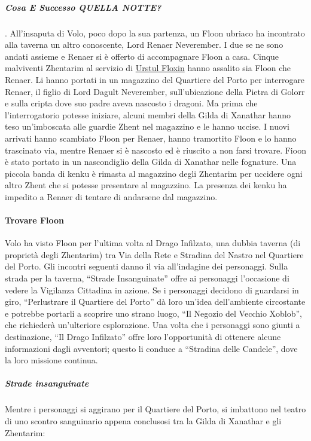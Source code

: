 \documentclass{article}
\begin{document}
                        \subparagraph{Cosa E Successo QUELLA NOTTE?} .
All’insaputa di Volo, poco dopo la sua partenza, un Floon
ubriaco ha incontrato alla taverna un altro conoscente,
Lord Renaer Neverember. I due se ne sono andati assieme
e Renaer si è offerto di accompagnare Floon a casa. Cinque
malviventi Zhentarim al servizio di \hyperlink{urstul}{Urstul Floxin}  hanno assalito sia Floon che Renaer. Li
hanno portati in un magazzino del Quartiere del Porto per
interrogare Renaer, il figlio di Lord Dagult Neverember,
sull’ubicazione della Pietra di Golorr e sulla cripta dove suo
padre aveva nascosto i dragoni. Ma prima che l'interrogatorio
potesse iniziare, alcuni membri della Gilda di Xanathar
hanno teso un'imboscata alle guardie Zhent nel magazzino e
le hanno uccise. I nuovi arrivati hanno scambiato Floon per
Renaer, hanno tramortito Floon e lo hanno trascinato via,
mentre Renaer si è nascosto ed è riuscito a non farsi trovare.
Fioon è stato portato in un nascondiglio della Gilda di
Xanathar nelle fognature. Una piccola banda di kenku è
rimasta al magazzino degli Zhentarim per uccidere ogni
altro Zhent che si potesse presentare al magazzino. La
presenza dei kenku ha impedito a Renaer di tentare di
andarsene dal magazzino.
                \paragraph{Trovare Floon}Volo ha visto Floon per l'ultima volta al Drago Infilzato, una dubbia taverna (di proprietà degli Zhentarim) tra Via della Rete e Stradina del Nastro nel Quartiere del Porto. Gli incontri seguenti danno il via all'indagine dei personaggi. 
Sulla strada per la taverna, “Strade Insanguinate” offre ai personaggi l'occasione di vedere la Vigilanza Cittadina in azione. Se i personaggi decidono di guardarsi in giro, “Perlustrare il Quartiere del Porto” dà loro un'idea dell'ambiente circostante e potrebbe portarli a scoprire uno strano luogo, “Il Negozio del Vecchio Xoblob”, che richiederà un'ulteriore esplorazione. Una volta che i personaggi sono giunti a destinazione, “Il Drago Infilzato” offre loro l'opportunità di ottenere alcune informazioni dagli avventori; questo li conduce a “Stradina delle Candele”, dove la loro missione continua.

                        \subparagraph{Strade insanguinate}
 Mentre i personaggi si aggirano per il Quartiere del Porto, si imbattono nel teatro di uno scontro sanguinario appena conclusosi tra la Gilda di Xanathar e gli Zhentarim: \newline
\end{document}

